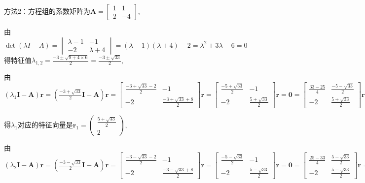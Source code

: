 \documentclass[12pt,UTF8]{ctexart}
\begin{document}
\begin{enumerate}
方法2：方程组的系数矩阵为$\bm A=\begin{bmatrix}1&1\\2&-4\end{bmatrix}$, 

由$\det(\lambda I-A)=\begin{vmatrix}\lambda-1&-1\\-2&\lambda+4\end{vmatrix}=(\lambda-1)(\lambda+4)-2=\lambda^2+3\lambda-6=0$得特征值$\lambda_{1,2}=\frac{-3\pm\sqrt{9+4\times6}}2=\frac{-3\pm\sqrt{33}}2$, 

由$(\lambda_1\bm I-\bm A)\bm r=(\frac{-3+\sqrt{33}}2\bm I-\bm A)\bm r=\begin{bmatrix}
\frac{-3+\sqrt{33}-2}2&-1\\
-2&\frac{-3+\sqrt{33}+8}2
\end{bmatrix}\bm r=\begin{bmatrix}
\frac{-5+\sqrt{33}}2&-1\\
-2&\frac{5+\sqrt{33}}2
\end{bmatrix}\bm r=\bm0=\begin{bmatrix}
\frac{33-25}4&\frac{-5-\sqrt{33}}2\\
-2&\frac{5+\sqrt{33}}2
\end{bmatrix}\bm r=\begin{bmatrix}
2&\frac{-5-\sqrt{33}}2\\
-2&\frac{5+\sqrt{33}}2
\end{bmatrix}\bm r=\begin{bmatrix}
2&\frac{-5-\sqrt{33}}2\\
0&0
\end{bmatrix}\bm r$

得$\lambda_1$对应的特征向量是$\bm r_1=\begin{pmatrix}\frac{5+\sqrt{33}}2\\2\end{pmatrix}$,

由$(\lambda_2\bm I-\bm A)\bm r=(\frac{-3-\sqrt{33}}2\bm I-\bm A)\bm r=\begin{bmatrix}\frac{-3-\sqrt{33}-2}2&-1\\-2&\frac{-3-\sqrt{33}+8}2\end{bmatrix}\bm r=\begin{bmatrix}\frac{-5-\sqrt{33}}2&-1\\-2&\frac{5-\sqrt{33}}2\end{bmatrix}\bm r=\bm0=\begin{bmatrix}\frac{25-33}4&\frac{5-\sqrt{33}}2\\-2&\frac{5-\sqrt{33}}2\end{bmatrix}\bm r=\begin{bmatrix}-2&\frac{5-\sqrt{33}}2\\-2&\frac{5-\sqrt{33}}2\end{bmatrix}\bm r=\begin{bmatrix}-2&\frac{5-\sqrt{33}}2\\0&0\end{bmatrix}\bm r$


\end{enumerate}
\end{document}
